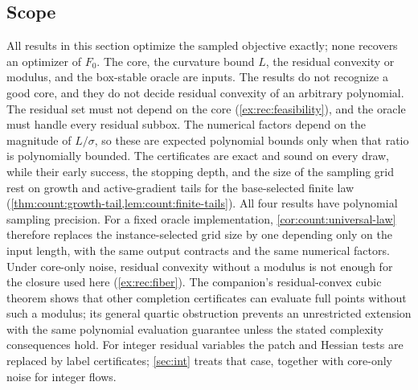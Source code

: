 \subsection{Scope}\label{sec:rec:scope}

All results in this section optimize the sampled objective exactly; none
recovers an optimizer of $F_0$. The core, the curvature bound $L$, the
residual convexity or modulus, and the box-stable oracle are inputs. The
results do not recognize a good core, and they do not decide residual
convexity of an arbitrary polynomial. The residual set must not depend on
the core (\cref{ex:rec:feasibility}), and the oracle must handle every
residual subbox. The numerical factors depend on the magnitude of
$L/\sigma$, so these are expected polynomial bounds only when that ratio
is polynomially bounded. The certificates are exact and sound on every draw,
while their early success, the stopping depth, and the size of the sampling
grid rest on growth and active-gradient tails for the base-selected finite
law (\cref{thm:count:growth-tail,lem:count:finite-tails}). All four results
have polynomial sampling precision. For a fixed oracle implementation,
\cref{cor:count:universal-law} therefore replaces the instance-selected grid
size by one depending only on the input length, with the same output
contracts and the same numerical factors. Under core-only noise,
residual convexity without a modulus is not enough for the closure used here
(\cref{ex:rec:fiber}). The companion's residual-convex cubic theorem shows
that other completion certificates can evaluate full points without such a
modulus; its general quartic obstruction prevents an unrestricted extension
with the same polynomial evaluation guarantee unless the stated complexity
consequences hold. For integer residual variables the patch and Hessian tests are
replaced by label certificates; \cref{sec:int} treats that case, together
with core-only noise for integer flows.
